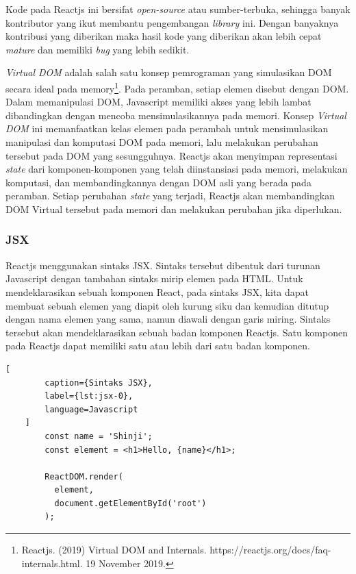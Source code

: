     Kode pada Reactjs ini bersifat \textit{open-source} atau sumber-terbuka,
    sehingga banyak kontributor yang ikut membantu pengembangan \textit{library}
    ini. Dengan banyaknya kontribusi yang diberikan maka hasil kode yang
    diberikan akan lebih cepat \textit{mature} dan memiliki \textit{bug} yang
    lebih sedikit.

    \textit{Virtual DOM} adalah salah satu konsep pemrograman yang simulasikan
    DOM secara ideal pada memory\footnote{Reactjs. (2019) Virtual DOM and
    Internals. https://reactjs.org/docs/faq-internals.html. 19 November 2019.}. Pada peramban, setiap
    elemen disebut dengan DOM. Dalam memanipulasi DOM, Javascript memiliki akses
    yang lebih lambat dibandingkan dengan mencoba mensimulasikannya pada memori.
    Konsep \textit{Virtual DOM} ini memanfaatkan kelas elemen pada perambah untuk
    mensimulasikan manipulasi dan komputasi DOM pada memori, lalu melakukan perubahan
    tersebut pada DOM yang sesungguhnya.
    Reactjs akan menyimpan representasi \textit{state} dari komponen-komponen yang telah
    diinstansiasi pada memori, melakukan komputasi, dan membandingkannya dengan 
    DOM asli yang berada pada
    peramban. Setiap perubahan \textit{state} yang terjadi, Reactjs akan
    membandingkan DOM Virtual tersebut pada memori dan melakukan perubahan jika
    diperlukan.
    
    \subsubsection{JSX}
    Reactjs menggunakan sintaks JSX. Sintaks tersebut dibentuk dari turunan Javascript 
    dengan tambahan sintaks mirip elemen pada HTML. Untuk mendeklarasikan sebuah 
    komponen React, pada sintaks JSX, kita dapat membuat sebuah elemen yang diapit
    oleh kurung siku dan kemudian ditutup dengan nama elemen yang sama, namun diawali
    dengan garis miring.
    Sintaks tersebut akan mendeklarasikan sebuah badan komponen Reactjs.
    Satu komponen pada Reactjs dapat memiliki satu atau lebih dari satu badan komponen.
    
    \begin{lstlisting}[
        caption={Sintaks JSX}, 
        label={lst:jsx-0}, 
        language=Javascript
    ]
        const name = 'Shinji';
        const element = <h1>Hello, {name}</h1>;
        
        ReactDOM.render(
          element,
          document.getElementById('root')
        );
    \end{lstlisting}
    
